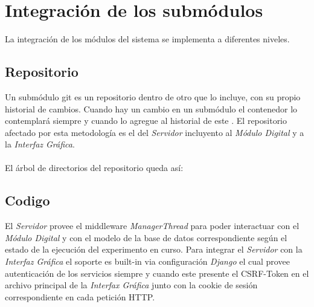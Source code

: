 \section{Integraci\'on de los subm\'odulos}

La integraci\'on de los m\'odulos del sistema se implementa a diferentes niveles.

\subsection{Repositorio}

Un subm\'odulo git es un repositorio dentro de otro que lo incluye, con su propio historial de cambios. Cuando hay un cambio en un subm\'odulo el contenedor lo contemplar\'a siempre y cuando lo agregue al historial de este
\cite{git_submodules}.
El repositorio afectado por esta metodolog\'ia es el del \textit{Servidor} incluyento al \textit{M\'odulo Digital} y a la \textit{Interfaz Gr\'afica}.
\\
\\
El \'arbol de directorios del repositorio queda as\'i:


\subsection{Codigo}
El \textit{Servidor} provee el middleware \textit{ManagerThread} para poder interactuar con el \textit{M\'odulo Digital} 
y con el modelo de la base de datos correspondiente seg\'un el estado de la ejecuci\'on del experimento en curso.
Para integrar el \textit{Servidor} con la \textit{Interfaz Gr\'afica} el soporte es built-in via configuraci\'on \textit{Django} el cual provee autenticaci\'on de los servicios siempre y cuando este presente el CSRF-Token en el archivo principal de la \textit{Interfax Gr\'afica}\cite{django_csrf} junto con la cookie de sesi\'on correspondiente en cada petici\'on HTTP\cite{django_cookie}.
\newpage

